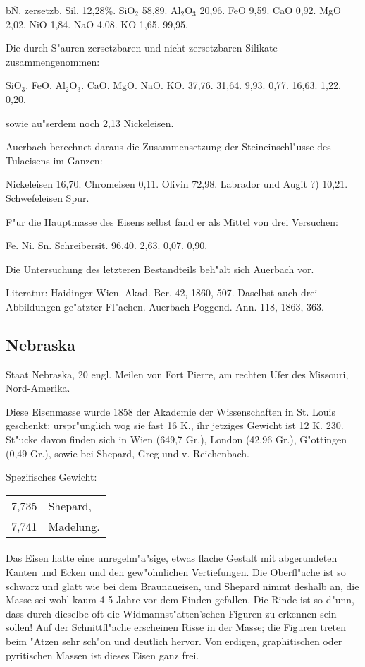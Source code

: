 \documentclass[a4paper, 11pt, oneside]{article}
\begin{document}
b\. N. zersetzb. Sil. 12,28\%.  
SiO$_{2}$ 58,89.  
Al$_{2}$O$_{3}$ 20,96.  
FeO 9,59.  
CaO 0,92.  
MgO 2,02.  
NiO 1,84.  
NaO 4,08.  
KO 1,65.  
99,95.

Die durch S"auren zersetzbaren und nicht zersetzbaren Silikate zusammengenommen:

SiO$_{3}$. FeO. Al$_{2}$O$_{3}$. CaO. MgO. NaO. KO.  
37,76. 31,64. 9,93. 0,77. 16,63. 1,22. 0,20.

sowie au"serdem noch 2,13 Nickeleisen.

Auerbach berechnet daraus die Zusammensetzung der Steineinschl"usse des Tulaeisens im Ganzen:

Nickeleisen 16,70.  
Chromeisen 0,11.  
Olivin 72,98.  
Labrador und Augit ?) 10,21.  
Schwefeleisen Spur.

F"ur die Hauptmasse des Eisens selbst fand er als Mittel von drei Versuchen:

Fe. Ni. Sn. Schreibersit.  
96,40. 2,63. 0,07. 0,90.

Die Untersuchung des letzteren Bestandteils beh"alt sich Auerbach vor.

Literatur: Haidinger Wien. Akad. Ber. 42, 1860, 507. Daselbst auch drei Abbildungen ge"atzter Fl"achen. Auerbach Poggend. Ann. 118, 1863, 363.

\subsection{Nebraska}

Staat Nebraska, 20 engl. Meilen von Fort Pierre, am rechten Ufer des Missouri, Nord-Amerika.

Diese Eisenmasse wurde 1858 der Akademie der Wissenschaften in St. Louis geschenkt; urspr"unglich wog sie fast 16 K., ihr jetziges Gewicht ist 12 K. 230. St"ucke davon finden sich in Wien (649,7 Gr.), London (42,96 Gr.), G"ottingen (0,49 Gr.), sowie bei Shepard, Greg und v. Reichenbach.

Spezifisches Gewicht:  
\begin{table}[!ht]
    \centering
    \begin{tabular}{l l}
        7,735 & Shepard,\\
        7,741 & Madelung.
    \end{tabular}
\end{table}
\paragraph{}
Das Eisen hatte eine unregelm"a"sige, etwas flache Gestalt mit abgerundeten Kanten und Ecken und den gew"ohnlichen Vertiefungen. Die Oberfl"ache ist so schwarz und glatt wie bei dem Braunaueisen, und Shepard nimmt deshalb an, die Masse sei wohl kaum 4-5 Jahre vor dem Finden gefallen. Die Rinde ist so d"unn, dass durch dieselbe oft die Widmannst"atten'schen Figuren zu erkennen sein sollen! Auf der Schnittfl"ache erscheinen Risse in der Masse; die Figuren treten beim "Atzen sehr sch"on und deutlich hervor. Von erdigen, graphitischen oder pyritischen Massen ist dieses Eisen ganz frei.
\end{document}

